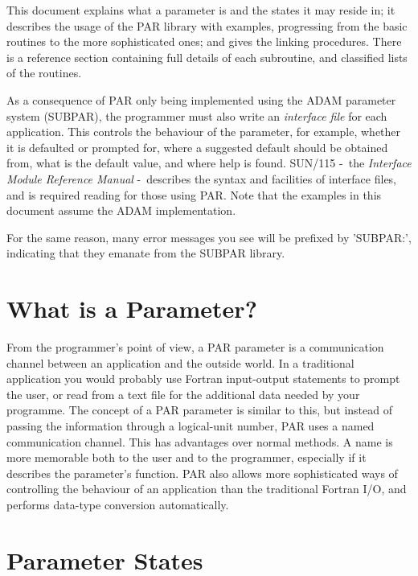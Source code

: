 \documentclass[twoside,11pt]{article}
\newcommand{\xref}[3]{#1}
\newcommand{\xlabel}[1]{}
\newcommand{\dash}{--}
\renewcommand{\dash}{-}
\begin{document}
This document explains what a parameter is and the states it may reside
in; it describes the usage of the PAR library with examples, progressing
from the basic routines to the more sophisticated ones; and gives the
linking procedures.  There is a reference section containing full
details of each subroutine, and classified lists of the routines. 

As a consequence of PAR only being implemented using the {\footnotesize
ADAM} parameter system (SUBPAR), the programmer must also write an {\it
interface file} for each application.  This controls the behaviour of
the parameter, for example, whether it is defaulted or prompted for,
where a suggested default should be obtained from, what is the default
value, and where help is found.  
\xref{SUN/115}{sun115}{} \dash\ the {\it Interface Module
Reference Manual\/} \dash\ describes the syntax and facilities of interface
files, and is required reading for those using PAR.  Note that the 
examples in this document assume the {\footnotesize ADAM} implementation.

For the same reason, many error messages you see will be prefixed by 'SUBPAR:',
indicating that they emanate from the SUBPAR library.

\section{\xlabel{what_is_a_parameter}What is a Parameter?}

From the programmer's point of view, a PAR parameter is a communication
channel between an application and the outside world.  In a traditional
application you would probably use Fortran input-output statements to
prompt the user, or read from a text file for the additional data needed
by your programme.  The concept of a PAR parameter is similar to this,
but instead of passing the information through a logical-unit number,
PAR uses a named communication channel.  This has advantages over normal
methods.  A name is more memorable both to the user and to the
programmer, especially if it describes the parameter's function.  PAR
also allows more sophisticated ways of controlling the behaviour of an
application than the traditional Fortran I/O, and performs data-type
conversion automatically.

\section{\xlabel{parameter_states_}Parameter States} \label{se:states} 
\end{document}
